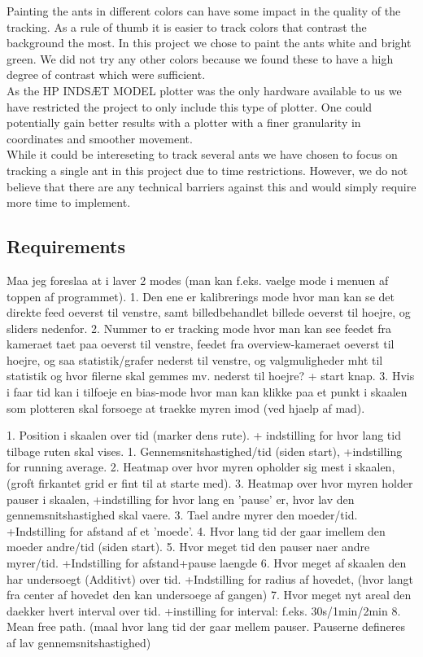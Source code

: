 Painting the ants in different colors can have some impact in the quality of the tracking. As a rule of thumb it is easier to track colors that contrast the background the most. In this project we chose to paint the ants white and bright green. We did not try any other colors because we found these to have a high degree of contrast which were sufficient. \\

As the HP INDSÆT MODEL plotter was the only hardware available to us we have restricted the project to only include this type of plotter. One could potentially gain better results with a plotter with a finer granularity in coordinates and smoother movement. \\

While it could be intereseting to track several ants we have chosen to focus on tracking a single ant in this project due to time restrictions. However, we do not believe that there are any technical barriers against this and would simply require more time to implement.

\subsection{Requirements}

Maa jeg foreslaa at i laver 2 modes (man kan f.eks. vaelge mode i menuen
af toppen af programmet).
1. Den ene er kalibrerings mode hvor man kan se det direkte feed oeverst
til venstre, samt billedbehandlet billede oeverst til hoejre, og sliders
nedenfor.
2. Nummer to er tracking mode hvor man kan see feedet fra kameraet taet
paa oeverst til venstre, feedet fra overview-kameraet oeverst til hoejre,
og saa statistik/grafer nederst til venstre, og valgmuligheder mht til
statistik og hvor filerne skal gemmes mv. nederst til hoejre? + start
knap.
3. Hvis i faar tid kan i tilfoeje en bias-mode hvor man kan klikke paa et
punkt i skaalen som plotteren skal forsoege at traekke myren imod (ved
hjaelp af mad).

1. Position i skaalen over tid (marker dens rute). + indstilling for hvor
lang tid tilbage ruten skal vises.
1. Gennemsnitshastighed/tid (siden start), +indstilling for running average.
2. Heatmap over hvor myren opholder sig mest i skaalen, (groft firkantet
grid er fint til at starte med).
3. Heatmap over hvor myren holder pauser i skaalen, +indstilling for hvor
lang en 'pause' er, hvor lav den gennemsnitshastighed skal vaere.
3. Tael andre myrer den moeder/tid. +Indstilling for afstand af et 'moede'.
4. Hvor lang tid der gaar imellem den moeder andre/tid (siden start).
5. Hvor meget tid den pauser naer andre myrer/tid. +Indstilling for
afstand+pause laengde
6. Hvor meget af skaalen den har undersoegt (Additivt) over tid.
+Indstilling for radius af hovedet, (hvor langt fra center af hovedet den
kan  undersoege af gangen)
7. Hvor meget nyt areal den daekker hvert interval over tid. +instilling
for interval: f.eks. 30s/1min/2min
8. Mean free path. (maal hvor lang tid der gaar mellem pauser. Pauserne
defineres af lav gennemsnitshastighed)

